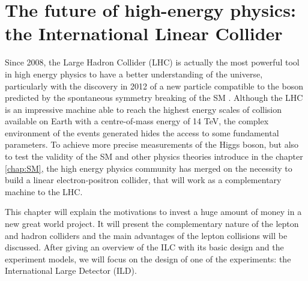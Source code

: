 \chapter[The ILC]{The future of high-energy physics: the International Linear Collider}
\label{chap:ILC}



  Since 2008, the Large Hadron Collider (LHC) is actually the most powerful tool in high energy physics to have a better understanding of the universe, particularly with the discovery in 2012 of a new particle compatible to the boson predicted by the spontaneous symmetry breaking of the SM \cite{Aad2012, Chatrchyan2012}.
  Although the LHC is an impressive machine able to reach the highest energy scales of collision available on Earth with a centre-of-mass energy of 14 TeV, the complex environment of the events generated hides the access to some fundamental parameters. 
  To achieve more precise measurements of the Higgs boson, but also to test the validity of the SM and other physics theories introduce in the chapter \ref{chap:SM}, the high energy physics community has merged on the necessity to build a linear electron-positron collider, that will work as a complementary machine to the LHC.
  
  This chapter will explain the motivations to invest a huge amount of money in a new great world project. It will present the complementary nature of the lepton and hadron colliders and the main advantages of the lepton collisions will be discussed.
  After giving an overview of the ILC with its basic design and the experiment models, we will focus on the design of one of the experiments: the International Large Detector (ILD).

 \minitoc
  

